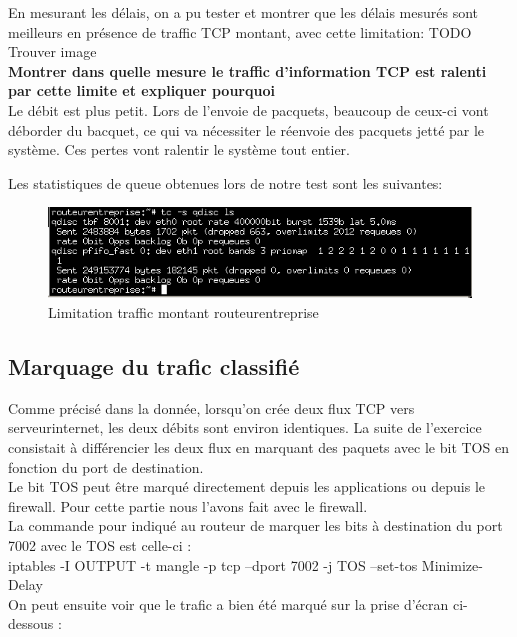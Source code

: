 \documentclass{article}
\begin{document}
En mesurant les délais, on a pu tester et montrer que les délais mesurés sont meilleurs en présence de traffic TCP montant, avec cette limitation:
TODO Trouver image
\\

\textbf{Montrer dans quelle mesure le traffic d'information TCP est ralenti par cette limite et expliquer pourquoi}\\
Le débit est plus petit. Lors de l'envoie de pacquets, beaucoup de ceux-ci vont déborder du bacquet, ce qui va nécessiter le réenvoie des pacquets jetté par le système. Ces pertes vont ralentir le système tout entier.

Les statistiques de queue obtenues lors de notre test sont les suivantes:
\begin{figure}[h]
  \centering
  \includegraphics[width=\linewidth]{./captures/13-stat-queue.png}
  \caption{Limitation traffic montant routeurentreprise}
  \label{fig:token-bucket}
\end{figure}

\subsection{Marquage du trafic classifié}

Comme précisé dans la donnée, lorsqu'on crée deux flux TCP vers serveurinternet, les deux débits sont environ identiques. La suite de l'exercice consistait à différencier les deux flux en marquant des paquets avec le bit TOS en fonction du port de destination.\\

Le bit TOS peut être marqué directement depuis les applications ou depuis le firewall. Pour cette partie nous l'avons fait avec le firewall.\\

La commande pour indiqué au routeur de marquer les bits à destination du port 7002 avec le TOS est celle-ci :\\

iptables -I OUTPUT -t mangle -p tcp --dport 7002 -j TOS --set-tos Minimize-Delay\\

On peut ensuite voir que le trafic a bien été marqué sur la prise d'écran ci-dessous : 
\end{document}
